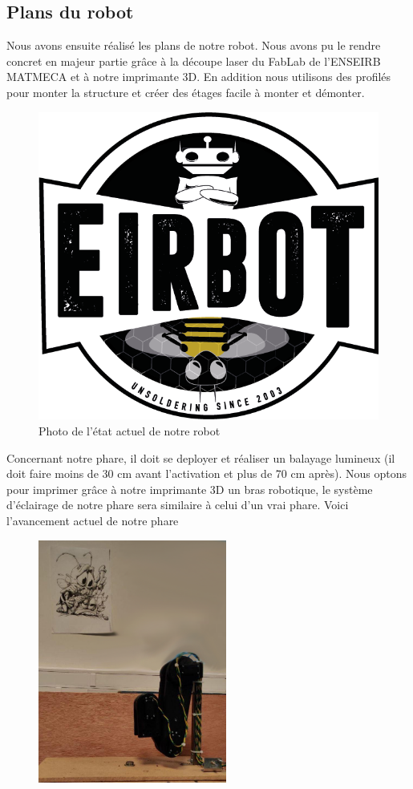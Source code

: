 \documentclass[a4paper,10pt]{article}
\begin{document}
\begin{spacing}{1.5}
\subsection{Plans du robot}
Nous avons ensuite réalisé les plans de notre robot. Nous avons pu le rendre
concret en majeur partie grâce à la découpe laser du FabLab de l'ENSEIRB MATMECA
et à notre imprimante 3D. En addition nous utilisons des profilés pour monter la
structure et créer des étages facile à monter et démonter.
\begin{figure}[H]
  \center
  \includegraphics[scale=0.3]{LogoEirbot.png}
  \caption{Photo de l'état actuel de notre robot}
\end{figure}
Concernant notre phare, il doit se deployer et réaliser un balayage lumineux (il
doit faire moins de 30 cm avant l'activation et plus de 70 cm après). Nous optons
pour imprimer grâce à notre imprimante 3D un bras robotique, le système
d'éclairage de notre phare sera similaire à celui d'un vrai phare. Voici
l'avancement actuel de notre phare
\begin{multicols}{2}
\begin{figure}[H]
  \center
  \includegraphics[scale=0.3, height=8cm]{phare_r.png}

\end{figure}
\end{multicols}
\end{spacing}
\end{document}
